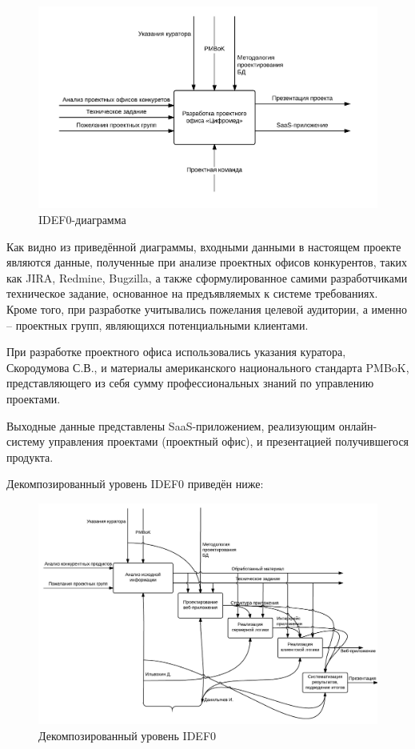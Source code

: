 \documentclass[a4paper, 14pt]{extarticle}
\begin{document}
\vspace{1em}

\begin{figure}[!htb]
  \centering
    \includegraphics[scale=0.35]{../shared_images/idef0.png}
   \caption{IDEF0-диаграмма}
    \label{fig:start}
\end{figure}

Как видно из приведённой диаграммы, входными данными в настоящем проекте являются данные, полученные при анализе проектных офисов конкурентов, таких как JIRA, Redmine, Bugzilla, а также сформулированное самими разработчиками техническое задание, основанное на предъявляемых к системе требованиях. Кроме того, при разработке учитывались пожелания целевой аудитории, а именно -- проектных групп, являющихся потенциальными клиентами.

При разработке проектного офиса использовались указания куратора, Скородумова С.В., и материалы американского национального стандарта PMBoK, представляющего из себя сумму профессиональных знаний по управлению проектами.

Выходные данные представлены SaaS-приложением, реализующим онлайн-систему управления проектами (проектный офис), и презентацией получившегося продукта.

Декомпозированный уровень IDEF0 приведён ниже:

\vspace{1em}

\begin{figure}[!htb]
  \centering
    \includegraphics[scale=0.45]{../shared_images/idef0-decomposed.png}
   \caption{Декомпозированный уровень IDEF0}
    \label{fig:start}
\end{figure}
\end{document}
